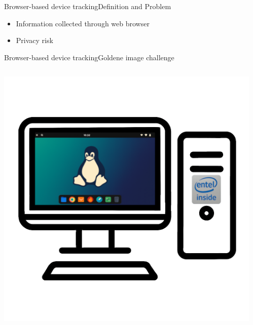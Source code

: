 \documentclass[aspectratio=169, hyperref={colorlinks=true, allcolors=SecondaryColor}, c]{beamer}
\begin{document}
\begin{frame}[fragile]{Browser-based device tracking}{Definition and Problem}
\begin{transformation}
\begin{adjustbox}{scale=1}
\begin{minipage}{1\textwidth}
				\end{minipage}
			\end{adjustbox}
		\end{transformation}
		\vspace{-0.5cm}
		\begin{itemize}
			\item Information collected through web browser
			\item Privacy risk
		\end{itemize}
	\end{frame}

	\begin{frame}[fragile]{Browser-based device tracking}{Goldene image challenge}
		\begin{columns}
			\begin{column}{0.33\textwidth}
				\includegraphics[width=1\textwidth]{./figures/computer_alpha_screen_2_golden.png}
			\end{column}
			\begin{column}{0.33\textwidth}

\end{column}
\end{columns}
\end{frame}
\end{document}
